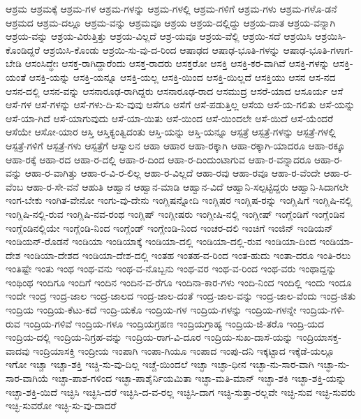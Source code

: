 {ಆಶ್ರಮ
ಆಶ್ರಮಕ್ಕೆ
ಆಶ್ರಮ-ಗಳ
ಆಶ್ರಮ-ಗಳನ್ನು
ಆಶ್ರಮ-ಗಳಲ್ಲಿ
ಆಶ್ರಮ-ಗಳಿಗೆ
ಆಶ್ರಮ-ಗಳು
ಆಶ್ರಮ-ಗಳೊ-ಡನೆ
ಆಶ್ರಮದ
ಆಶ್ರಮ-ದಲ್ಲೂ
ಆಶ್ರಮ-ವನ್ನು
ಆಶ್ರಮವೂ
ಆಶ್ರಯ
ಆಶ್ರಯ-ದಲ್ಲಿದ್ದು
ಆಶ್ರಯ-ದಾತ
ಆಶ್ರಯ-ವನ್ನಾಗಿ
ಆಶ್ರಯ-ವನ್ನು
ಆಶ್ರಯ-ವಿರುತ್ತಿತ್ತು
ಆಶ್ರಯ-ವಿಲ್ಲದೆ
ಆಶ್ರ-ಯವೂ
ಆಶ್ರಯ-ವೆಲ್ಲಿ
ಆಶ್ರಯಿ-ಸದೆ
ಆಶ್ರಯಿಸಿ
ಆಶ್ರಯಿಸಿ-ಕೊಂಡಿದ್ದರೆ
ಆಶ್ರಯಿಸಿ-ಕೊಂಡು
ಆಶ್ರಯಿ-ಸು-ವು-ದ-ರಿಂದ
ಆಷಾಢದ
ಆಷಾಢ-ಭೂತಿ-ಗಳನ್ನು
ಆಷಾಢ-ಭೂತಿ-ಗಳಾಗ-ಬೇಡಿ
ಆಸಂಸಿದ್ಧೇಃ
ಆಸಕ್ತ-ರಾಗಿದ್ದಾರೆಂದು
ಆಸಕ್ತ-ರಾದರು
ಆಸಕ್ತರೋ
ಆಸಕ್ತಿ
ಆಸಕ್ತಿ-ಕರ-ವಾಗಿವೆ
ಆಸಕ್ತಿ-ಗಳನ್ನು
ಆಸಕ್ತಿ-ಯಂತೆ
ಆಸಕ್ತಿ-ಯನ್ನು
ಆಸಕ್ತಿ-ಯನ್ನೂ
ಆಸಕ್ತಿ-ಯಲ್ಲ
ಆಸಕ್ತಿ-ಯಿಂದ
ಆಸಕ್ತಿ-ಯಿಲ್ಲದೆ
ಆಸಕ್ತಿಯು
ಆಸನ
ಆಸ-ನದ
ಆಸನ-ದಲ್ಲಿ
ಆಸನ-ವನ್ನು
ಆಸನಾರೂಢ-ರಾಗಿದ್ದರು
ಆಸನಾರೂಢ-ರಾದ
ಆಸಮುದ್ರ
ಆಸರೆ-ಯಾದ
ಆಸೂರ್ಯ
ಆಸೆ
ಆಸೆ-ಗಳ
ಆಸೆ-ಗಳನ್ನು
ಆಸೆ-ಗಳು-ದಿ-ಸು-ವುವು
ಆಸೆಗೂ
ಆಸೆಗೆ
ಆಸೆ-ಪಡುತ್ತಿಲ್ಲ
ಆಸೆಯ
ಆಸೆ-ಯ-ಗಲಿತು
ಆಸೆ-ಯನ್ನು
ಆಸೆ-ಯಾ-ಗಿದೆ
ಆಸೆ-ಯಾಗುವುದು
ಆಸೆ-ಯಾ-ಯಿತು
ಆಸೆ-ಯಿಂದ
ಆಸೆ-ಯಿಂದಲೇ
ಆಸೆ-ಯಿದೆ
ಆಸೆ-ಯೆಂದರೆ
ಆಸೆಯೇ
ಆಸೋ-ಯಾರ
ಆಸ್ತಿ
ಆಸ್ತಿಕ್ಯಂತ್ವಿದಂತು
ಆಸ್ತಿ-ಯನ್ನು
ಆಸ್ತಿ-ಯನ್ನೂ
ಆಸ್ಪತ್ರೆ
ಆಸ್ಪತ್ರೆ-ಗಳನ್ನು
ಆಸ್ಪತ್ರೆ-ಗಳಲ್ಲಿ
ಆಸ್ಪತ್ರೆ-ಗಳಿಗೆ
ಆಸ್ಪತ್ರೆ-ಗಳು
ಆಸ್ಪತ್ರೆಗೆ
ಆಸ್ವಾಲನ
ಆಹಾ
ಆಹಾರ
ಆಹಾ-ರಕ್ಕಾಗಿ
ಆಹಾ-ರಕ್ಕಾಗಿ-ಯಾದರೂ
ಆಹಾ-ರಕ್ಕೂ
ಆಹಾ-ರಕ್ಕೆ
ಆಹಾ-ರದ
ಆಹಾ-ರ-ದಲ್ಲಿ
ಆಹಾ-ರ-ದಿಂದ
ಆಹಾ-ರ-ದಿಂದುಂಟಾಗುವ
ಆಹಾ-ರ-ವನ್ನಾದರೂ
ಆಹಾ-ರ-ವನ್ನು
ಆಹಾ-ರ-ವಾಗಿತ್ತು
ಆಹಾ-ರ-ವಿ-ರ-ಲಿಲ್ಲ
ಆಹಾ-ರ-ವಿಲ್ಲದೆ
ಆಹಾ-ರವು
ಆಹಾ-ರವೂ
ಆಹಾ-ರ-ವೆಂದೇ
ಆಹಾ-ರ-ವೆಂಬ
ಆಹಾ-ರ-ಸೇ-ವನೆ
ಆಹುತಿ
ಆಹ್ವಾನ
ಆಹ್ವಾನ-ಮಾಡಿ
ಆಹ್ವಾನ-ವಿದೆ
ಆಹ್ವಾನಿ-ಸಲ್ಪಟ್ಟಿದ್ದರು
ಆಹ್ವಾನಿ-ಸಿದಾಗಲೇ
ಇಂಗ-ಬೇಕು
ಇಂಗಿತ-ವೇನೋ
ಇಂಗು-ವು-ದೇನು
ಇಂಗ್ಲಿಷನ್ನೋದಿ
ಇಂಗ್ಲಿಷರ
ಇಂಗ್ಲಿಷ-ರನ್ನು
ಇಂಗ್ಲಿಷಿಗೆ
ಇಂಗ್ಲಿಷಿ-ನಲ್ಲಿ
ಇಂಗ್ಲಿಷಿ-ನಲ್ಲಿ-ರುವ
ಇಂಗ್ಲಿಷಿ-ನವ-ರಂಥ
ಇಂಗ್ಲಿಷ್
ಇಂಗ್ಲೀಷರು
ಇಂಗ್ಲೀಷಿ-ನಲ್ಲಿ
ಇಂಗ್ಲೀಷ್
ಇಂಗ್ಲೆಂಡಿಗೆ
ಇಂಗ್ಲೆಂಡಿನ
ಇಂಗ್ಲೆಂಡಿನಲ್ಲಿಯೇ
ಇಂಗ್ಲೆಂಡಿ-ನಿಂದ
ಇಂಗ್ಲೆಂಡ್
ಇಂಗ್ಲೇಂಡಿ-ನಿಂದ
ಇಂಚರ-ದಲಿ
ಇಂಚಿಗೆ
ಇಂಜಿನ್
ಇಂಡಿಯನ್
ಇಂಡಿಯನ್-ರೊಡನೆ
ಇಂಡಿಯಾ
ಇಂಡಿಯಾಕ್ಕೆ
ಇಂಡಿಯಾ-ದಲ್ಲಿ
ಇಂಡಿಯಾ-ದಲ್ಲಿ-ರುವ
ಇಂಡಿಯಾ-ದಿಂದ
ಇಂಡಿಯಾ-ದೇಶ
ಇಂಡಿಯಾ-ದೇಶದ
ಇಂಡಿಯಾ-ದೇಶ-ದಲ್ಲಿ
ಇಂತಹ
ಇಂತಹ-ವ-ರಿಂದ
ಇಂತ-ಹುದು
ಇಂತಾ-ದರೂ
ಇಂತಿ-ರಲು
ಇಂತಿಷ್ಟೇ
ಇಂತು
ಇಂಥ
ಇಂಥ-ವನು
ಇಂಥ-ವ-ನೊಬ್ಬನು
ಇಂಥ-ವರ
ಇಂಥ-ವ-ರಿಂದ
ಇಂಥ-ವರು
ಇಂಥಾದ್ದನ್ನು
ಇಂಥಿಂಥ
ಇಂದಿಗೂ
ಇಂದಿಗೆ
ಇಂದಿನ
ಇಂದಿನ-ವ-ರೆಗೂ
ಇಂದಿನಾ-ಕಾರ-ಗಳು
ಇಂದಿ-ನಿಂದ
ಇಂದಿಲ್ಲಿ
ಇಂದು
ಇಂದೂ
ಇಂದೇ
ಇಂದ್ರ
ಇಂದ್ರ-ಜಾಲ
ಇಂದ್ರ-ಜಾಲದ
ಇಂದ್ರ-ಜಾಲ-ದಂತೆ
ಇಂದ್ರ-ಜಾಲ-ವನ್ನು
ಇಂದ್ರ-ಜಾಲ-ವೆಂದು
ಇಂದ್ರ-ಜಿತು
ಇಂದ್ರಿಯ
ಇಂದ್ರಿಯ-ಕೆಟು-ಕದೆ
ಇಂದ್ರಿ-ಯಕೊ
ಇಂದ್ರಿಯ-ಗಳ
ಇಂದ್ರಿಯ-ಗಳನ್ನು
ಇಂದ್ರಿಯ-ಗಳನ್ನೇ
ಇಂದ್ರಿಯ-ಗಳಿ-ರುವ
ಇಂದ್ರಿಯ-ಗಳಿವೆ
ಇಂದ್ರಿಯ-ಗಳೂ
ಇಂದ್ರಿಯಗ್ರಹಣ
ಇಂದ್ರಿಯಗ್ರಾಹ್ಯ
ಇಂದ್ರಿಯ-ಜಿ-ತರೊ
ಇಂದ್ರಿ-ಯದ
ಇಂದ್ರಿಯ-ದಲ್ಲಿ
ಇಂದ್ರಿಯ-ನಿಗ್ರಹ-ವನ್ನು
ಇಂದ್ರಿಯ-ರಾಗ-ವಿ-ದೂರ
ಇಂದ್ರಿಯ-ಸುಖ-ದಾಸೆ-ಯನ್ನು
ಇಂದ್ರಿಯಾಸಕ್ತ-ವಾದವು
ಇಂದ್ರಿಯಾಸಕ್ತಿ
ಇಂದ್ರೀಯ
ಇಂಪಾಗಿ
ಇಂಪಾ-ಗಿಯೂ
ಇಂಪಾದ
ಇಂಪು-ದನಿ
ಇಕ್ಕಟ್ಟಾದ
ಇಕ್ಕೆಡೆ-ಯಲ್ಲೂ
ಇಗೋ
ಇಚ್ಚಾ
ಇಚ್ಚಾ-ಶಕ್ತಿ
ಇಚ್ಚಿ-ಸು-ವು-ದಿಲ್ಲ
ಇಚ್ಚೆ-ಯಿಂದಲೆ
ಇಚ್ಛಾ
ಇಚ್ಛಾ-ಧೀನ
ಇಚ್ಛಾ-ನು-ಸಾರ-ವಾಗಿ
ಇಚ್ಛಾ-ನು-ಸಾರ-ವಾಗಿಯೆ
ಇಚ್ಛಾ-ಪಾಶ-ಗಳಿಂದ
ಇಚ್ಛಾ-ಪಾಶೈರ್ನಿಯಮಿತಾ
ಇಚ್ಛಾ-ಮತಿ-ಮಾನ್
ಇಚ್ಛಾ-ಶಕಿ
ಇಚ್ಛಾ-ಶಕ್ತಿ-ಯನ್ನು
ಇಚ್ಛಾ-ಶಕ್ತಿ-ಯಿದೆ
ಇಚ್ಛಿಸಿ
ಇಚ್ಛಿಸಿ-ದರೆ
ಇಚ್ಛಿಸಿ-ದ-ವ-ರಲ್ಲ
ಇಚ್ಛಿಸಿ-ದಾಗ
ಇಚ್ಛಿ-ಸುತ್ತಾ-ರಲ್ಲವೇ
ಇಚ್ಛಿ-ಸುವ
ಇಚ್ಛಿ-ಸುವರು
ಇಚ್ಛಿ-ಸುವರೋ
ಇಚ್ಛಿ-ಸು-ವು-ದಾದರೆ
}
